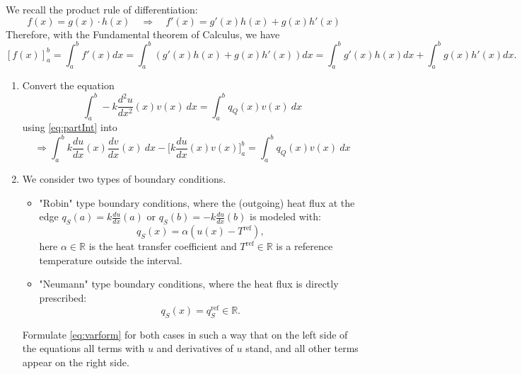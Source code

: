\documentclass[a4paper,12pt]{article}
\begin{document}
\head{}{}{}
 
\begin{task}{}
We recall the product rule of differentiation:
$$
 f(x) = g(x) \cdot h(x) \quad \Longrightarrow \quad f'(x) = g'(x) h(x) + g(x) h'(x)
$$
Therefore, with the Fundamental theorem of Calculus, we have
\begin{equation}\label{eq:partInt}
 [f(x)]_a^b = \int_a^b f'(x) dx = \int_a^b \left( g'(x) h(x) + g(x) h'(x) \right) dx = \int_a^b g'(x) h(x) dx + \int_a^b g(x) h'(x) dx.
\end{equation}
 
\begin{enumerate}
  \item 
  Convert the equation
  $$ 
  \int_a^b - k \frac{d^2 u}{d x^2}(x) v(x) \ dx = \int_a^b q_Q(x) v(x) \ dx
  $$
  using \eqref{eq:partInt} into 
  \begin{equation}\label{eq:varform}
      \Longrightarrow  \int_a^b k \frac{d u}{d x}(x) \frac{d v}{d x}(x) \ dx - \Big[k \frac{d u}{dx}(x) v(x) \Big]_a^b = \int_a^b q_Q(x) v(x) \ dx
  \end{equation}
  \item We consider two types of boundary conditions.
  \begin{itemize}
    \item
    "Robin" type boundary conditions, where the (outgoing) heat flux
    at the edge
    $q_S(a) = k \frac{d u}{dx}(a)$ or  $q_S(b) = - k \frac{d u}{dx}(b)$
    is modeled with:
  $$
    q_S(x) = \alpha (u(x) - T^{\text{ref}}), 
  $$
  here $\alpha \in \mathbb{R}$ is the heat transfer coefficient and $T^{\text{ref}} \in \mathbb{R}$ is a reference temperature outside the interval.
    \item
    "Neumann" type boundary conditions, where the heat flux is directly prescribed:
  $$
    q_S(x) = q_S^{\text{ref}} \in \mathbb{R}. 
  $$
  \end{itemize}
  Formulate \eqref{eq:varform} for both cases in such a way that on the left side of the equations all terms with $u$ and derivatives of $u$ stand, and all other terms appear on the right side.
\end{enumerate}
\end{task}
\end{document}
